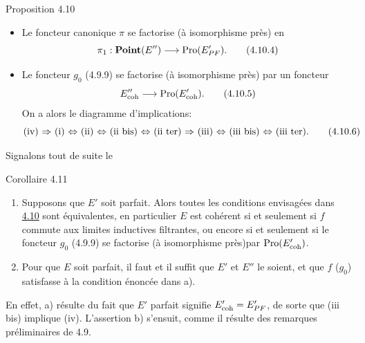 \documentclass[10pt]{../fichiers-configuration-latex/smfart}
\begin{document}
\begin{enonce*}{Proposition 4.10}
\begin{itemize}
\item[(iii ter)] Le foncteur canonique $\pi$  se factorise (à
  isomorphisme près) en
\begin{equation*}
\pi_1 : \Ppoint(E'') \to \Pro(E'_{PF}){\quoi}.\tag{4.10.4}
\end{equation*}

\item[(iv)] Le foncteur $g_0$ (4.9.9) se factorise (à isomorphisme près)
  par un foncteur
\begin{equation*}
E''_{\coh} \to \Pro(E'_{\coh}){\quoi}.\tag{4.10.5}
\end{equation*}
On a alors le diagramme d'implications:
\begin{equation*}
\text{\rm (iv) $\Rightarrow$ (i) $\Leftrightarrow$ (ii) $\Leftrightarrow$ (ii bis)
  $\Leftrightarrow$ (ii ter) $\Rightarrow$ (iii) $\Leftrightarrow$ (iii bis)
  $\Leftrightarrow$ (iii ter)}{}.\tag{4.10.6}
\end{equation*}
\end{itemize}
\end{enonce*}

Signalons tout de suite le

\begin{enonce*}{Corollaire 4.11}
\begin{enumerate}
\renewcommand{\theenumi}{\alph{enumi}}
\renewcommand{\labelenumi}{\theenumi)}
\item Supposons que $E'$ soit parfait. Alors toutes les conditions
  envisagées dans \hyperref[VI.prop4.10]{4.10} sont équivalentes, en particulier $E$ est
  cohérent si et seulement si $f$ commute aux limites inductives
  filtrantes, ou encore si et seulement si le foncteur $g_0$ (4.9.9)
  se factorise (à isomorphisme près)\pageoriginale par $\operatorname{Pro}(E'_{\mathrm{coh}})$.

\item Pour que $E$ soit parfait, il faut et il suffit que $E'$ et
  $E''$ le soient, et que $f$ (\resp $g_0$) satisfasse à la condition
  énoncée dans {\rm a)}.
\end{enumerate}
\end{enonce*}

En effet, a) résulte du fait que $E'$ parfait signifie $E'_{\mathrm{coh}} =
E'_{PF}$, de sorte que (iii bis) implique (iv). L'assertion b)
s'ensuit, comme il résulte des remarques préliminaires de
4.9.
\end{document}
